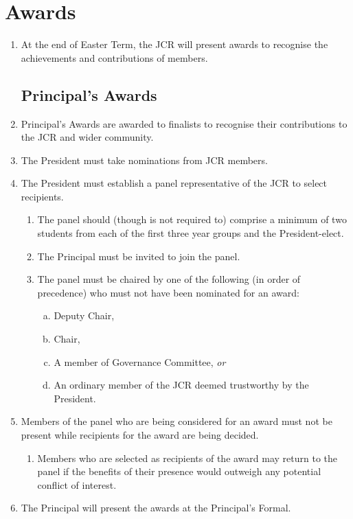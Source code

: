 \documentclass[12pt]{article}
\begin{document}
\section{Awards}
\begin{enumerate}
    \item At the end of Easter Term, the JCR will present awards to recognise the achievements and contributions of members.
    \subsection{Principal's Awards}
    \item Principal's Awards are awarded to finalists to recognise their contributions to the JCR and wider community.
    \item The President must take nominations from JCR members.
    \item The President must establish a panel representative of the JCR to select recipients.
    \begin{enumerate}
        \item The panel should (though is not required to) comprise a minimum of two students from each of the first three year groups and the President-elect.
        \item The Principal must be invited to join the panel.
        \item The panel must be chaired by one of the following (in order of precedence) who must not have been nominated for an award:
        \begin{enumerate}[(a)]
            \item Deputy Chair,
            \item Chair,
            \item A member of Governance Committee, \emph{or}
            \item An ordinary member of the JCR deemed trustworthy by the President.
        \end{enumerate}
    \end{enumerate}
    \item Members of the panel who are being considered for an award must not be present while recipients for the award are being decided.
    \begin{enumerate}
        \item Members who are selected as recipients of the award may return to the panel if the benefits of their presence would outweigh any potential conflict of interest.
    \end{enumerate}
    \item The Principal will present the awards at the Principal's Formal.

\end{enumerate}
\end{document}
